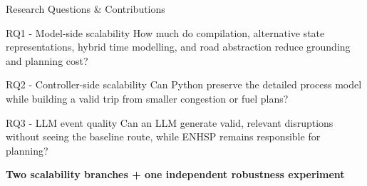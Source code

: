 \documentclass[10pt,aspectratio=169]{beamer}
\begin{document}
\begin{frame}{Research Questions \& Contributions}
  \begin{beamerboxesrounded}[upper=block title,lower=block body,shadow=true]{RQ1 - Model-side scalability}
    How much do compilation, alternative state representations, hybrid time modelling, and road abstraction reduce grounding and planning cost?
  \end{beamerboxesrounded}

  \vspace{0.18cm}
  \begin{beamerboxesrounded}[upper=block title,lower=block body,shadow=true]{RQ2 - Controller-side scalability}
    Can Python preserve the detailed process model while building a valid trip from smaller congestion or fuel plans?
  \end{beamerboxesrounded}

  \vspace{0.18cm}
  \begin{beamerboxesrounded}[upper=block title,lower=block body,shadow=true]{RQ3 - LLM event quality}
    Can an LLM generate valid, relevant disruptions without seeing the baseline route, while ENHSP remains responsible for planning?
  \end{beamerboxesrounded}

  \vspace{0.28cm}
  \centering
  \textbf{Two scalability branches + one independent robustness experiment}
\end{frame}
\end{document}

